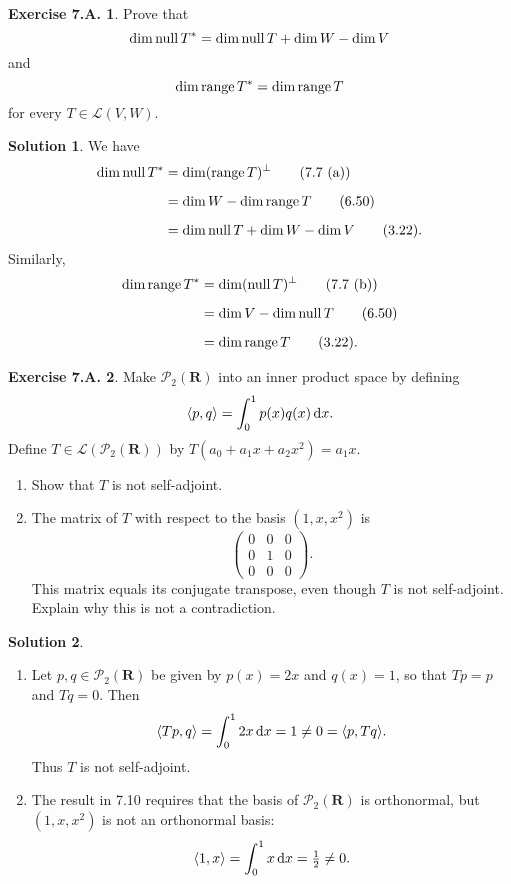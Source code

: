 \documentclass[12pt]{article}
\theoremstyle{definition}
\theoremstyle{exercise}
\newtheorem{exercise}{Exercise 7.A.}
\theoremstyle{solution}
\newtheorem*{solution}{Solution}
\newcommand{\upd}{\,\text{d}}
\newcommand{\poly}{\mathcal{P}}
\newcommand{\lmap}{\mathcal{L}}
\newcommand{\Null}{\text{null\,}}
\newcommand{\Range}{\text{range\,}}
\newcommand{\ocomp}[1]{#1^{\perp}}
\newcommand{\R}{\mathbf{R}}
\DeclarePairedDelimiter\ip{\langle}{\rangle}
\begin{document}
\begin{exercise}
\label{ex:5}
    Prove that
    \[
        \dim \Null T^* = \dim \Null T + \dim W - \dim V
    \]
    and
    \[
        \dim \Range T^* = \dim \Range T
    \]
    for every \( T \in \lmap(V, W) \).
\end{exercise}

\begin{solution}
    We have
    \begin{align*}
        \dim \Null T^* &= \dim \ocomp{(\Range T)} \tag{7.7 (a)} \\[2mm]
        &= \dim W - \dim \Range T \tag{6.50} \\[2mm]
        &= \dim \Null T + \dim W - \dim V \tag{3.22}.
    \end{align*}
    Similarly,
    \begin{align*}
        \dim \Range T^* &= \dim \ocomp{(\Null T)} \tag{7.7 (b)} \\[2mm]
        &= \dim V - \dim \Null T \tag{6.50} \\[2mm]
        &= \dim \Range T \tag{3.22}.
    \end{align*}
\end{solution}

\begin{exercise}
\label{ex:6}
    Make \( \poly_2(\R) \) into an inner product space by defining
    \[
        \ip{p, q} = \int_0^1 p(x) q(x) \upd x.
    \]
    Define \( T \in \lmap(\poly_2(\R)) \) by \( T(a_0 + a_1 x + a_2 x^2) = a_1 x \).
    \begin{enumerate}
        \item Show that \( T \) is not self-adjoint.

        \item The matrix of \( T \) with respect to the basis \( (1, x, x^2) \) is
        \[
            \begin{pmatrix}
                0 & 0 & 0 \\
                0 & 1 & 0 \\
                0 & 0 & 0
            \end{pmatrix}.
        \]
        This matrix equals its conjugate transpose, even though \( T \) is not self-adjoint. Explain why this is not a contradiction.
    \end{enumerate}
\end{exercise}

\begin{solution}
    \begin{enumerate}
        \item Let \( p, q \in \poly_2(\R) \) be given by \( p(x) = 2x \) and \( q(x) = 1 \), so that \( Tp = p \) and \( Tq = 0 \). Then
        \[
            \ip{Tp, q} = \int_0^1 2x \upd x = 1 \neq 0 = \ip{p, Tq}.
        \]
        Thus \( T \) is not self-adjoint.

        \item The result in 7.10 requires that the basis of \( \poly_2(\R) \) is orthonormal, but \( (1, x, x^2) \) is not an orthonormal basis:
        \[
            \ip{1, x} = \int_0^1 x \upd x = \tfrac{1}{2} \neq 0.
        \]
    \end{enumerate}
\end{solution}
\end{document}
